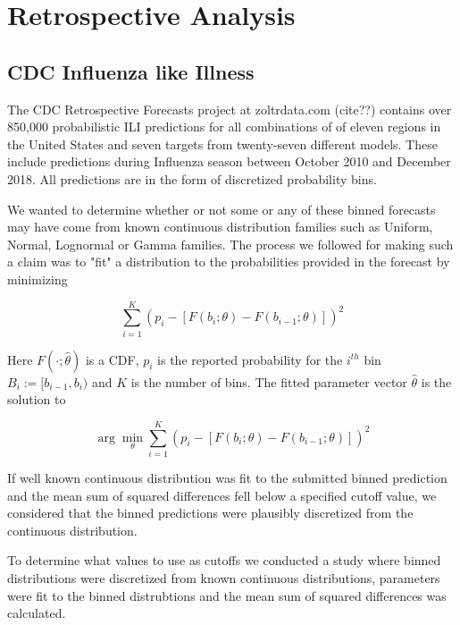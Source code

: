 \documentclass{article}\usepackage[]{graphicx}\usepackage[]{color}
\begin{document}
\newpage


\section{Retrospective Analysis}

\subsection{CDC Influenza like Illness}
The CDC Retrospective Forecasts project at zoltrdata.com (cite??) contains over
850,000 probabilistic ILI predictions for all combinations of of eleven regions 
in the United States and seven targets from twenty-seven different models. These
include predictions during Influenza season between October 2010 and December
2018. All predictions are in the form of discretized probability bins. 

We wanted to determine whether or not some or any of these binned forecasts may
have come from known continuous distribution families such as Uniform, Normal, 
Lognormal or Gamma families. The process we followed for making such a claim was
to "fit" a distribution to the probabilities provided in the forecast by
minimizing

\begin{equation}
  \sum_{i=1}^K (p_i - [F(b_i; \theta) - F(b_{i-1}; \theta)])^2
\end{equation}

Here $F(\cdot; \hat{\theta})$ is a CDF, $p_i$ is the reported probability for 
the $i^{th}$ bin $B_i := [b_{i-1}, b_i)$ and $K$ is the number of bins.
The fitted parameter vector $\hat{\theta}$ is the solution to 

\begin{equation}
\arg\min_{\theta}\sum_{i=1}^K (p_i - 
[F(b_i; \theta) - F(b_{i-1}; \theta)])^2
\end{equation}

If well known continuous distribution was fit to the submitted binned prediction
and the mean sum of squared differences fell below a specified cutoff value, we
considered that the binned predictions were plausibly discretized from the 
continuous distribution.


To determine what values to use as cutoffs we conducted a study where 
binned distributions were discretized from known continuous distributions, 
parameters were fit to the binned distrubtions and the mean sum of squared 
differences was calculated.
\end{document}
